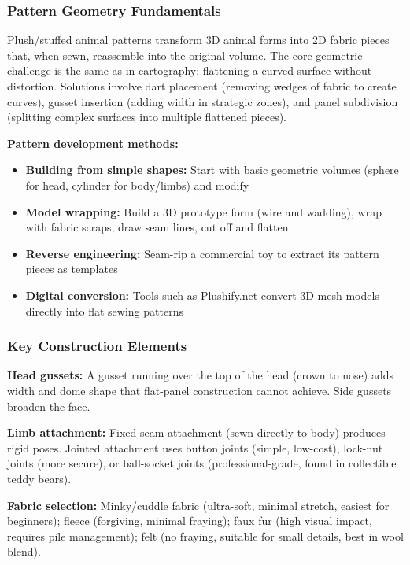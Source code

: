 \documentclass[11pt,letterpaper]{article}
\begin{document}
\subsubsection{Pattern Geometry Fundamentals}

Plush/stuffed animal patterns transform 3D animal forms into 2D fabric pieces that, when sewn, reassemble into the original volume. The core geometric challenge is the same as in cartography: flattening a curved surface without distortion. Solutions involve dart placement (removing wedges of fabric to create curves), gusset insertion (adding width in strategic zones), and panel subdivision (splitting complex surfaces into multiple flattened pieces).

\textbf{Pattern development methods:}
\begin{itemize}[noitemsep]
  \item \textbf{Building from simple shapes:} Start with basic geometric volumes (sphere for head, cylinder for body/limbs) and modify
  \item \textbf{Model wrapping:} Build a 3D prototype form (wire and wadding), wrap with fabric scraps, draw seam lines, cut off and flatten
  \item \textbf{Reverse engineering:} Seam-rip a commercial toy to extract its pattern pieces as templates
  \item \textbf{Digital conversion:} Tools such as Plushify.net convert 3D mesh models directly into flat sewing patterns
\end{itemize}

\subsubsection{Key Construction Elements}

\textbf{Head gussets:} A gusset running over the top of the head (crown to nose) adds width and dome shape that flat-panel construction cannot achieve. Side gussets broaden the face.

\textbf{Limb attachment:} Fixed-seam attachment (sewn directly to body) produces rigid poses. Jointed attachment uses button joints (simple, low-cost), lock-nut joints (more secure), or ball-socket joints (professional-grade, found in collectible teddy bears).

\textbf{Fabric selection:} Minky/cuddle fabric (ultra-soft, minimal stretch, easiest for beginners); fleece (forgiving, minimal fraying); faux fur (high visual impact, requires pile management); felt (no fraying, suitable for small details, best in wool blend).
\end{document}
